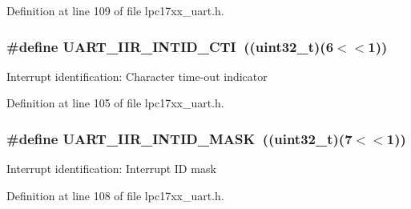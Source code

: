 \-Definition at line 109 of file lpc17xx\-\_\-uart.\-h.

\hypertarget{group___u_a_r_t___private___macros_ga965ba229214955385f11277549b7ecce}{
\subsubsection[{\-U\-A\-R\-T\-\_\-\-I\-I\-R\-\_\-\-I\-N\-T\-I\-D\-\_\-\-C\-T\-I}]{\setlength{\rightskip}{0pt plus 5cm}\#define {\bf \-U\-A\-R\-T\-\_\-\-I\-I\-R\-\_\-\-I\-N\-T\-I\-D\-\_\-\-C\-T\-I}~((uint32\-\_\-t)(6$<$$<$1))}}\label{group___u_a_r_t___private___macros_ga965ba229214955385f11277549b7ecce}
\-Interrupt identification\-: \-Character time-\/out indicator 

\-Definition at line 105 of file lpc17xx\-\_\-uart.\-h.

\hypertarget{group___u_a_r_t___private___macros_ga6f78952aec5835ac753718323b681910}{
\subsubsection[{\-U\-A\-R\-T\-\_\-\-I\-I\-R\-\_\-\-I\-N\-T\-I\-D\-\_\-\-M\-A\-S\-K}]{\setlength{\rightskip}{0pt plus 5cm}\#define {\bf \-U\-A\-R\-T\-\_\-\-I\-I\-R\-\_\-\-I\-N\-T\-I\-D\-\_\-\-M\-A\-S\-K}~((uint32\-\_\-t)(7$<$$<$1))}}\label{group___u_a_r_t___private___macros_ga6f78952aec5835ac753718323b681910}
\-Interrupt identification\-: \-Interrupt \-I\-D mask 

\-Definition at line 108 of file lpc17xx\-\_\-uart.\-h.

